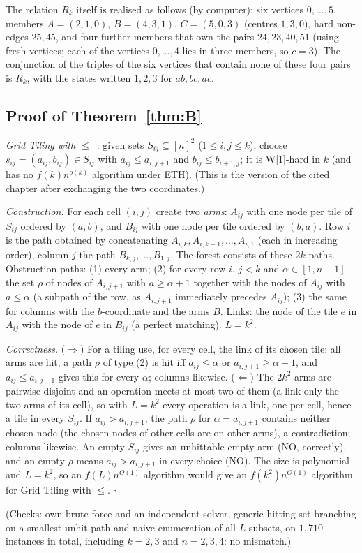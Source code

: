 The relation $R_k$ itself is realised as follows (by computer): six vertices $0,\dots,5$, members $A=(2,1,0)$, $B=(4,3,1)$, $C=(5,0,3)$ (centres $1,3,0$), hard non-edges $25,45$, and four further members that own the pairs $24,23,40,51$ (using fresh vertices; each of the vertices $0,\dots,4$ lies in three members, so $c=3$). The conjunction of the triples of the six vertices that contain none of these four pairs is $R_k$, with the states written $1,2,3$ for $ab,bc,ac$.

\subsection{Proof of Theorem~\ref{thm:B}}\label{app:softB}
\emph{Grid Tiling with $\le$}~\cite{Cygan15}: given sets $S_{ij}\subseteq[n]^2$ ($1\le i,j\le k$), choose $s_{ij}=(a_{ij},b_{ij})\in S_{ij}$ with $a_{ij}\le a_{i,j+1}$ and $b_{ij}\le b_{i+1,j}$; it is W[1]-hard in $k$ (and has no $f(k)n^{o(k)}$ algorithm under ETH). (This is the version of the cited chapter after exchanging the two coordinates.)

\emph{Construction.} For each cell $(i,j)$ create two \emph{arms}: $A_{ij}$ with one node per tile of $S_{ij}$ ordered by $(a,b)$, and $B_{ij}$ with one node per tile ordered by $(b,a)$. Row $i$ is the path obtained by concatenating $A_{i,k},A_{i,k-1},\dots,A_{i,1}$ (each in increasing order), column $j$ the path $B_{k,j},\dots,B_{1,j}$. The forest consists of these $2k$ paths. Obstruction paths: (1) every arm; (2) for every row $i$, $j<k$ and $\alpha\in[1,n-1]$ the set $\rho$ of nodes of $A_{i,j+1}$ with $a\ge\alpha+1$ together with the nodes of $A_{ij}$ with $a\le\alpha$ (a subpath of the row, as $A_{i,j+1}$ immediately precedes $A_{ij}$); (3) the same for columns with the $b$-coordinate and the arms $B$. Links: the node of the tile $e$ in $A_{ij}$ with the node of $e$ in $B_{ij}$ (a perfect matching). $L=k^2$.

\emph{Correctness.} ($\Rightarrow$) For a tiling use, for every cell, the link of its chosen tile: all arms are hit; a path $\rho$ of type (2) is hit iff $a_{ij}\le\alpha$ or $a_{i,j+1}\ge\alpha+1$, and $a_{ij}\le a_{i,j+1}$ gives this for every $\alpha$; columns likewise. ($\Leftarrow$) The $2k^2$ arms are pairwise disjoint and an operation meets at most two of them (a link only the two arms of its cell), so with $L=k^2$ every operation is a link, one per cell, hence a tile in every $S_{ij}$. If $a_{ij}>a_{i,j+1}$, the path $\rho$ for $\alpha=a_{i,j+1}$ contains neither chosen node (the chosen nodes of other cells are on other arms), a contradiction; columns likewise. An empty $S_{ij}$ gives an unhittable empty arm (NO, correctly), and an empty $\rho$ means $a_{ij}>a_{i,j+1}$ in every choice (NO). The size is polynomial and $L=k^2$, so an $f(L)n^{O(1)}$ algorithm would give an $f(k^2)n^{O(1)}$ algorithm for Grid Tiling with $\le$. \hfill$\square$

(Checks: own brute force and an independent solver, generic hitting-set branching on a smallest unhit path and naive enumeration of all $L$-subsets, on $1{,}710$ instances in total, including $k=2,3$ and $n=2,3,4$: no mismatch.)
